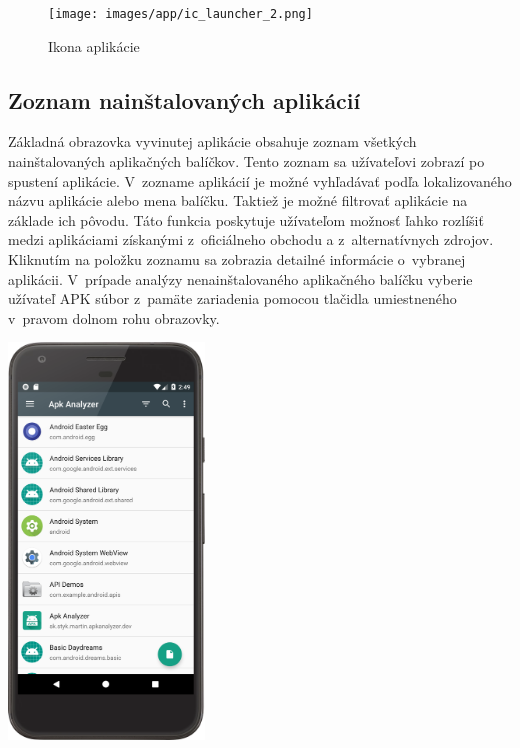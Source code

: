 \begin{figure}[htb]
	\centering
    \texttt{[image: images/app/ic\_launcher\_2.png]}
	\caption{Ikona aplikácie}
	\label{fig:icon}
\end{figure}


\subsection{Zoznam nainštalovaných aplikácií}
\begin{minipage}[H]{\textwidth}
\begin{minipage}[t]{0.48\textwidth}
Základná obrazovka vyvinutej aplikácie  obsahuje zoznam všetkých nainštalovaných aplikačných balíčkov. Tento zoznam sa užívateľovi zobrazí po spustení aplikácie. V~zozname aplikácií je možné vyhľadávať podľa lokalizovaného názvu aplikácie alebo mena balíčku. Taktiež je možné filtrovať aplikácie na základe ich pôvodu. Táto funkcia poskytuje užívateľom možnosť ľahko rozlíšiť medzi aplikáciami získanými z~oficiálneho obchodu a z~alternatívnych zdrojov. Kliknutím na položku zoznamu sa zobrazia detailné informácie o~vybranej aplikácii. V~prípade analýzy nenainštalovaného aplikačného balíčku vyberie užívateľ APK súbor z~pamäte zariadenia pomocou tlačidla umiestneného v~pravom dolnom rohu obrazovky.
\end{minipage}%
\hfill
\centering
\begin{minipage}[t][][b]{0.45\textwidth}
\centering
\includegraphics[width=5.2cm]{images/app/list_device.png}
\centering
{}
\label{fig:app-list}
\end{minipage}%
\end{minipage}

